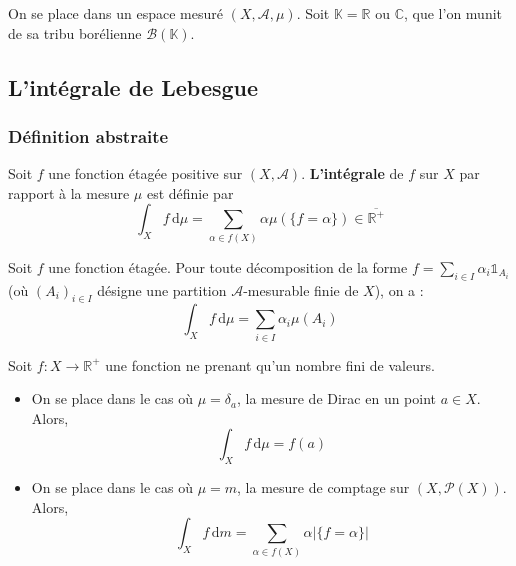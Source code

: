 



  On se place dans un espace mesuré $(X, \mathcal{A}, \mu)$. Soit $\mathbb{K} = \mathbb{R}$ ou $\mathbb{C}$, que l'on munit de sa tribu borélienne $\mathcal{B}(\mathbb{K})$.

  \subsection{L'intégrale de Lebesgue}

  \subsubsection{Définition abstraite}


  \begin{definition}
    Soit $f$ une fonction étagée positive sur $(X, \mathcal{A})$. \textbf{L'intégrale} de $f$ sur $X$ par rapport à la mesure $\mu$ est définie par
    \[ \int_X f \, \mathrm{d}\mu = \sum_{\alpha \in f(X)} \alpha \mu(\{ f = \alpha \}) \in \overline{\mathbb{R}^+} \]
  \end{definition}

  \begin{proposition}
    Soit $f$ une fonction étagée. Pour toute décomposition de la forme $f = \sum_{i \in I} \alpha_i \mathbb{1}_{A_i}$ (où $(A_i)_{i \in I}$ désigne une partition $\mathcal{A}$-mesurable finie de $X$), on a :
    \[ \int_X f \, \mathrm{d}\mu = \sum_{i \in I} \alpha_i \mu(A_i) \]
  \end{proposition}

  \begin{example}
    Soit $f : X \rightarrow \mathbb{R}^+$ une fonction ne prenant qu'un nombre fini de valeurs.
    \begin{itemize}
      \item On se place dans le cas où $\mu = \delta_a$, la mesure de Dirac en un point $a \in X$. Alors,
      \[ \int_X f \, \mathrm{d}\mu = f(a) \]
      \item On se place dans le cas où $\mu = m$, la mesure de comptage sur $(X, \mathcal{P}(X))$. Alors,
      \[ \int_X f \, \mathrm{d}m = \sum_{\alpha \in f(X)} \alpha |\{ f = \alpha \}| \]
    \end{itemize}
  \end{example}

